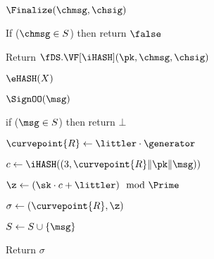 \begin{figure}[t]
{			\begin{oracle}{$\Finalize(\chmsg, \chsig)$}
			    \item If ($\chmsg\in S$) then return $\false$
				\item Return $\fDS.\VF[\iHASH](\pk,\chmsg, \chsig)$ \vspace{2pt}
			\end{oracle}
		}
		{
			
			\begin{oracle}{$\eHASH(X)$}
				\item {}
				\item {}
			\end{oracle}
			\ExptSepSpace
			
			
			\begin{oracle}{$\SignOO(\msg)$}
					\item if ($\msg \in S$) then return $\bot$
				\item \gamechange{$\littler \getsr \Z_{\Prime}$}
				\item {}
				\item {}
				\item \quad {}
				\item {}
				\item $\curvepoint{R} \gets \littler\cdot \generator$
				\item $c \gets 
			\iHASH((3,\curvepoint{R}\|\pk\|\msg))$
				
				\item $\z \gets (\sk \cdot c + \littler) \mod \Prime$
				\item $\sigma \gets (\curvepoint{R},\z)$
				\item $S \gets S \cup \{\msg\}$
				\item Return $\sigma$
			\end{oracle}
			\ExptSepSpace
			
}
\end{figure}
